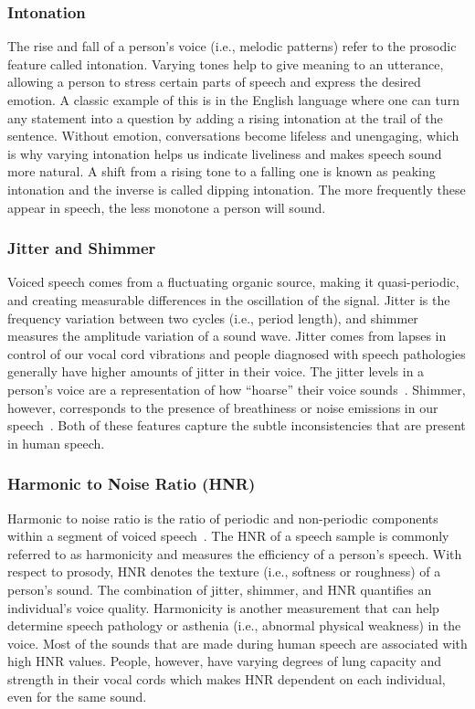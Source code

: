 \documentclass[10pt, journal, anonymous=true]{IEEEtran}
\begin{document}
\subsubsection{Intonation}
The rise and fall of a person's voice (i.e., melodic patterns) refer to the
prosodic feature called intonation. Varying tones help to give meaning to an utterance,
allowing a person to stress certain parts of speech and express the desired
emotion. A classic example of this is in the English language where one can
turn any statement into a question by adding a rising intonation at the trail
of the sentence. Without emotion, conversations become lifeless and unengaging,
which is why varying intonation helps us indicate liveliness and makes speech
sound more natural. A shift from a rising tone to a falling one is known as
peaking intonation and the inverse is called dipping intonation. The more
frequently these appear in speech, the less monotone a person will sound. 


\subsubsection{Jitter and Shimmer}
Voiced speech comes from a fluctuating organic source, making it quasi-periodic,
and creating measurable differences in the oscillation of the signal.  Jitter is
the frequency variation between two cycles (i.e., period length), and shimmer
measures the amplitude variation of a sound wave. Jitter comes from lapses in
control of our vocal cord vibrations and people diagnosed with speech pathologies generally have higher amounts of jitter in their voice. The jitter levels in a person's voice are a
representation of how ``hoarse'' their voice sounds~\cite{vocal_measures}.
Shimmer, however, corresponds to the presence of breathiness or noise emissions
in our speech~\cite{vocal_analysis}.  Both of these features capture the subtle
inconsistencies that are present in human speech.

\subsubsection{Harmonic to Noise Ratio (HNR)}
Harmonic to noise ratio is the ratio of periodic and non-periodic components
within a segment of voiced speech~\cite{hnr_murphy}. The HNR of a speech sample
is commonly referred to as harmonicity and measures the efficiency of a
person's speech. With respect to prosody, HNR denotes the texture (i.e.,
softness or roughness) of a person's sound. The combination of jitter, shimmer,
and HNR quantifies an individual's voice quality.  Harmonicity is another
measurement that can help determine speech pathology or asthenia (i.e.,
abnormal physical weakness) in the voice.  Most of the sounds that are made
during human speech are associated with high HNR values.  People, however, have
varying degrees of lung capacity and strength in their vocal cords which makes
HNR dependent on each individual, even for the same sound. 
\end{document}
